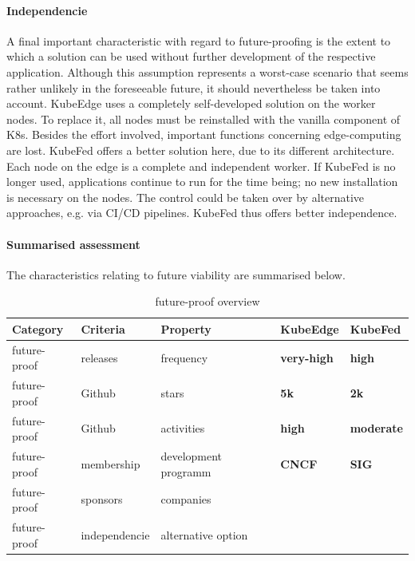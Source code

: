 \documentclass[MSC,Master,english]{twbook}%
\newcommand{\cmark}{\ding{51}}%
\newcommand{\xmark}{\ding{55}}%
\begin{document}
\paragraph{Independencie} A final important characteristic with regard to future-proofing is the extent to which a solution can be used without further development of the respective application. Although this assumption represents a worst-case scenario that seems rather unlikely in the foreseeable future, it should nevertheless be taken into account. KubeEdge uses a completely self-developed solution on the worker nodes. To replace it, all nodes must be reinstalled with the vanilla component of \ac{K8s}. Besides the effort involved, important functions concerning edge-computing are lost. \ac{KubeFed} offers a better solution here, due to its different architecture. Each node on the edge is a complete and independent worker. If KubeFed is no longer used, applications continue to run for the time being; no new installation is necessary on the nodes. The control could be taken over by alternative approaches, e.g. via \ac{CI/CD} pipelines. KubeFed thus offers better independence.

\paragraph{Summarised assessment} The characteristics relating to future viability are summarised below.  
\begin{table}[ht]
    \begin{center}
        \begin{tabular}{|l|l|l|l|l|}
            \hline
            Category & Criteria & Property & \textbf{KubeEdge} & \textbf{KubeFed} \\
            \hline
            future-proof & releases  & frequency & \textbf{very-high} & \textbf{high} \\
            future-proof & Github  & stars & \textbf{5k} & \textbf{2k} \\
            future-proof & Github & activities & \textbf{high} & \textbf{moderate} \\
            future-proof & membership & development programm & \textbf{CNCF} & \textbf{SIG} \\
            future-proof & sponsors & companies & \cmark & \xmark \\
            future-proof & independencie & alternative option & \xmark & \cmark \\
            \hline
        \end{tabular}
        \caption{future-proof overview}
        \label{tab:fp-overview}
    \end{center}
\end{table}
\end{document}
